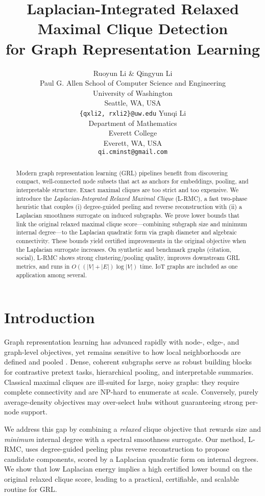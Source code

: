 \documentclass{article} %
\title{Laplacian-Integrated Relaxed Maximal Clique Detection\\ for Graph Representation Learning}
\author{
Ruoyun Li \& Qingyun Li \\
Paul G. Allen School of Computer Science and Engineering \\
University of Washington \\
Seattle, WA, USA \\
\texttt{\{qxli2, rxli2\}@uw.edu}
\And
Yunqi Li \\
Department of Mathematics \\
Everett College \\
Everett, WA, USA \\
\texttt{qi.cminst@gmail.com}
}
\theoremstyle{remark}
\begin{document}
\maketitle

\begin{abstract}
Modern graph representation learning (GRL) pipelines benefit from discovering compact, well-connected node subsets that act as anchors for embeddings, pooling, and interpretable structure. Exact maximal cliques are too strict and too expensive. We introduce the \emph{Laplacian-Integrated Relaxed Maximal Clique} (L-RMC), a fast two-phase heuristic that couples (i) degree-guided peeling and reverse reconstruction with (ii) a Laplacian smoothness surrogate on induced subgraphs. We prove lower bounds that link the original relaxed maximal clique score---combining subgraph size and minimum internal degree---to the Laplacian quadratic form via graph diameter and algebraic connectivity. These bounds yield certified improvements in the original objective when the Laplacian surrogate increases. On synthetic and benchmark graphs (citation, social), L-RMC shows strong clustering/pooling quality, improves downstream GRL metrics, and runs in \(O\!\left((|V|+|E|)\log|V|\right)\) time. IoT graphs are included as one application among several.
\end{abstract}

\section{Introduction}
Graph representation learning has advanced rapidly with node-, edge-, and graph-level objectives, yet remains sensitive to how local neighborhoods are defined and pooled \citep{kipf2016semi,hamilton2017inductive,perozzi2014deepwalk,grover2016node2vec}. Dense, coherent subgraphs serve as robust building blocks for contrastive pretext tasks, hierarchical pooling, and interpretable summaries. Classical maximal cliques are ill-suited for large, noisy graphs: they require complete connectivity and are NP-hard to enumerate at scale. Conversely, purely average-density objectives may over-select hubs without guaranteeing strong per-node support.

We address this gap by combining a \emph{relaxed} clique objective that rewards size and \emph{minimum} internal degree with a spectral smoothness surrogate. Our method, L-RMC, uses degree-guided peeling plus reverse reconstruction to propose candidate components, scored by a Laplacian quadratic form on internal degrees. We show that low Laplacian energy implies a high certified lower bound on the original relaxed clique score, leading to a practical, certifiable, and scalable routine for GRL.
\end{document}
